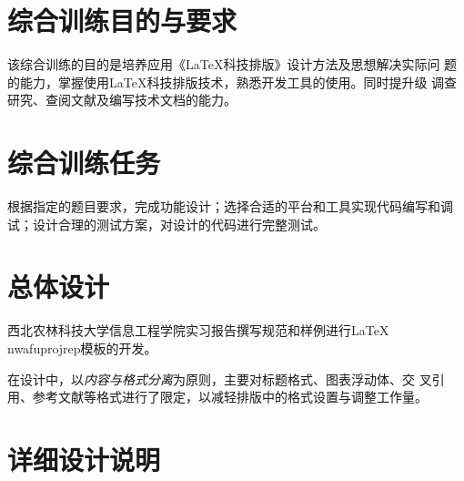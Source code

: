 \documentclass[
  ]{nwafuprojrep}
\begin{document}

\makecover
\tableofcontents
\cleardoublepage
\pagestyle{main}%


\begin{abstract}
  针对课程综合实习实习报告(或论文)排版中的格式问题，基于\emph{内容与格式分离}的\LaTeX{}排版技术，通分析西北农林科技大学信息工程学院给出的课程综合实习实习报告(或论文)排版规范和样例文件，采用文档类的方式，结合作者前期开发的boxie、tikz-flowchart、tikz-imglabels等宏包，设计并开发了\enquote{nwafuprojrep.cls}西北农林科技大学信息工程学院课程综合实习实习报告(或论文)\LaTeX{}模板。该模板能够根据操作系统自动选择需要的字体，提供了基本的格式限定及代码、流程图绘制、图像标注等实用功能。测试结果表明，该模板在Ubuntu、Winodws、Mac下均可以按规范实现实习报告(或论文)的正确排版。
\end{abstract}
\makeabstract

\section{综合训练目的与要求}
该综合训练的目的是培养应用《\LaTeX{}科技排版》设计方法及思想解决实际问
题的能力，掌握使用\LaTeX{}科技排版技术，熟悉开发工具的使用。同时提升级
调查研究、查阅文献及编写技术文档的能力。
\section{综合训练任务}
根据指定的题目要求，完成功能设计；选择合适的平台和工具实现代码编写和调
试；设计合理的测试方案，对设计的代码进行完整测试。
\section{总体设计}
西北农林科技大学信息工程学院实习报告撰写规范和样例进行\LaTeX{}
nwafuprojrep模板的开发。

在设计中，以\emph{内容与格式分离}为原则，主要对标题格式、图表浮动体、交
叉引用、参考文献等格式进行了限定，以减轻排版中的格式设置与调整工作量。

\section{详细设计说明}
\end{document}
